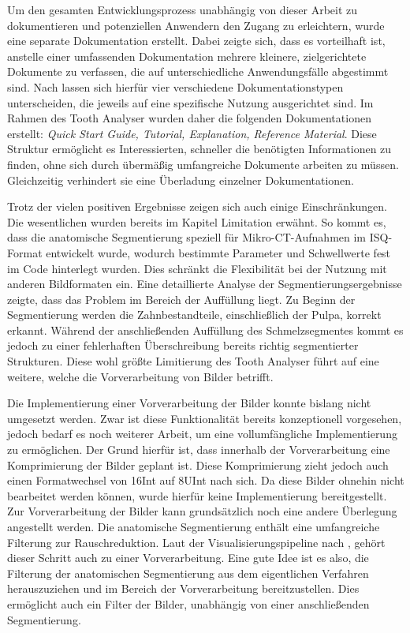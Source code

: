 Um den gesamten Entwicklungsprozess unabhängig von dieser Arbeit zu
dokumentieren und potenziellen Anwendern den Zugang zu erleichtern, wurde eine separate
Dokumentation erstellt. Dabei zeigte sich, dass es vorteilhaft ist, anstelle
einer umfassenden Dokumentation mehrere kleinere, zielgerichtete Dokumente zu verfassen,
die auf unterschiedliche Anwendungsfälle abgestimmt sind. Nach \citet{procida2017}
lassen sich hierfür vier verschiedene Dokumentationstypen unterscheiden, die jeweils
auf eine spezifische Nutzung ausgerichtet sind. Im Rahmen des Tooth Analyser
wurden daher die folgenden Dokumentationen erstellt: \textit{Quick Start Guide, Tutorial,
Explanation, Reference Material}. Diese Struktur ermöglicht es Interessierten,
schneller die benötigten Informationen zu finden, ohne sich durch übermäßig umfangreiche
Dokumente arbeiten zu müssen. Gleichzeitig verhindert sie eine Überladung
einzelner Dokumentationen.

Trotz der vielen positiven Ergebnisse zeigen sich auch einige Einschränkungen. Die
wesentlichen wurden bereits im Kapitel Limitation erwähnt. So kommt es, dass die
anatomische Segmentierung speziell für Mikro-\ac{CT}-Aufnahmen im \ac{ISQ}-Format
entwickelt wurde, wodurch bestimmte Parameter und Schwellwerte fest im Code
hinterlegt wurden. Dies schränkt die Flexibilität bei der Nutzung mit anderen Bildformaten
ein. Eine detaillierte Analyse der Segmentierungsergebnisse zeigte, dass das Problem
im Bereich der Auffüllung liegt. Zu Beginn der Segmentierung werden die
Zahnbestandteile, einschließlich der Pulpa, korrekt erkannt. Während der anschließenden
Auffüllung des Schmelzsegmentes kommt es jedoch zu einer fehlerhaften Überschreibung
bereits richtig segmentierter Strukturen. Diese wohl größte Limitierung des
Tooth Analyser führt auf eine weitere, welche die Vorverarbeitung von Bilder betrifft.

Die Implementierung einer Vorverarbeitung der Bilder konnte bislang nicht umgesetzt
werden. Zwar ist diese Funktionalität bereits konzeptionell vorgesehen, jedoch bedarf
es noch weiterer Arbeit, um eine vollumfängliche Implementierung zu ermöglichen.
Der Grund hierfür ist, dass innerhalb der Vorverarbeitung eine Komprimierung der
Bilder geplant ist. Diese Komprimierung zieht jedoch auch einen Formatwechsel von
\ac{16Int} auf \ac{8UInt} nach sich. Da diese Bilder ohnehin nicht bearbeitet
werden können, wurde hierfür keine Implementierung bereitgestellt. Zur
Vorverarbeitung der Bilder kann grundsätzlich noch eine andere Überlegung
angestellt werden. Die anatomische Segmentierung enthält eine umfangreiche Filterung
zur Rauschreduktion. Laut der Visualisierungspipeline nach \citet[S.~50]{handels2000},
gehört dieser Schritt auch zu einer Vorverarbeitung. Eine gute Idee ist es also,
die Filterung der anatomischen Segmentierung aus dem eigentlichen Verfahren
herauszuziehen und im Bereich der Vorverarbeitung bereitzustellen. Dies ermöglicht
auch ein Filter der Bilder, unabhängig von einer anschließenden Segmentierung.

